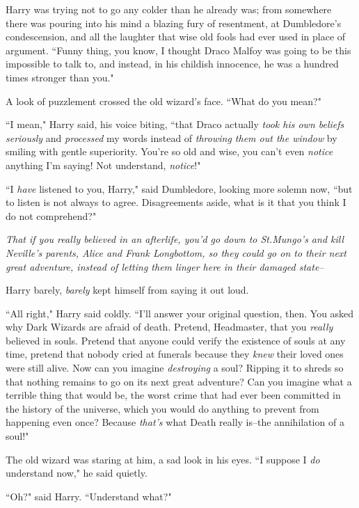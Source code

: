 Harry was trying not to go any colder than he already was; from somewhere there was pouring into his mind a blazing fury of resentment, at Dumbledore's condescension, and all the laughter that wise old fools had ever used in place of argument. ``Funny thing, you know, I thought Draco Malfoy was going to be this impossible to talk to, and instead, in his childish innocence, he was a hundred times stronger than you."

A look of puzzlement crossed the old wizard's face. ``What do you mean?"

``I mean," Harry said, his voice biting, ``that Draco actually \emph{took his own beliefs seriously} and \emph{processed} my words instead of \emph{throwing them out the window} by smiling with gentle superiority. You're so old and wise, you can't even \emph{notice} anything I'm saying! Not understand, \emph{notice}!"

``I \emph{have} listened to you, Harry," said Dumbledore, looking more solemn now, ``but to listen is not always to agree. Disagreements aside, what is it that you think I do not comprehend?"

\emph{That if you \emph{really} believed in an afterlife, you'd go down to St.\?Mungo's and kill Neville's parents, Alice and Frank Longbottom, so they could go on to their \emph{next great adventure}, instead of letting them linger here in their damaged state\---}

Harry barely, \emph{barely} kept himself from saying it out loud.

``All right," Harry said coldly. ``I'll answer your original question, then. You asked why Dark Wizards are afraid of death. Pretend, Headmaster, that you \emph{really} believed in souls. Pretend that anyone could verify the existence of souls at any time, pretend that nobody cried at funerals because they \emph{knew} their loved ones were still alive. Now can you imagine \emph{destroying} a soul? Ripping it to shreds so that nothing remains to go on its next great adventure? Can you imagine what a terrible thing that would be, the worst crime that had ever been committed in the history of the universe, which you would do anything to prevent from happening even once? Because \emph{that's} what Death really is\---the annihilation of a soul!"

The old wizard was staring at him, a sad look in his eyes. ``I suppose I \emph{do} understand now," he said quietly.

``Oh?" said Harry. ``Understand what?"

